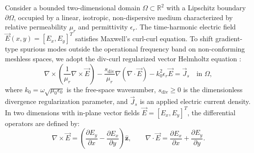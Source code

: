\documentclass[VANCOUVER,Times1COL]{WileyNJD-v5}
\begin{document}
Consider a bounded two-dimensional domain $\Omega \subset \mathbb{R}^2$ with a Lipschitz boundary $\partial\Omega$, occupied by a linear, isotropic, non-dispersive medium characterized by relative permeability $\mu_r$ and permittivity $\epsilon_r$. The time-harmonic electric field $\vec{E}(x, y) = [E_x, E_y]^T$ satisfies Maxwell's curl-curl equation. To shift gradient-type spurious modes outside the operational frequency band on non-conforming meshless spaces, we adopt the div-curl regularized vector Helmholtz equation \cite{stable_vnmm2d_2026}:
\begin{equation}
    \nabla \times \left(\frac{1}{\mu_r} \nabla \times \vec{E}\right) - \frac{s_{\mathrm{div}}}{\mu_r} \nabla(\nabla \cdot \vec{E}) - k_0^2 \epsilon_r \vec{E} = \vec{J}_s \quad \text{in } \Omega,
    \label{eq:helmholtz_pde}
\end{equation}
where $k_0 = \omega\sqrt{\mu_0\epsilon_0}$ is the free-space wavenumber, $s_{\mathrm{div}} \ge 0$ is the dimensionless divergence regularization parameter, and $\vec{J}_s$ is an applied electric current density. In two dimensions with in-plane vector fields $\vec{E} = [E_x, E_y]^T$, the differential operators are defined by:
\begin{equation}
    \nabla \times \vec{E} = \left(\frac{\partial E_y}{\partial x} - \frac{\partial E_x}{\partial y}\right) \hat{\mathbf{z}}, \qquad \nabla \cdot \vec{E} = \frac{\partial E_x}{\partial x} + \frac{\partial E_y}{\partial y}.
\end{equation}
\end{document}
